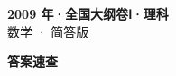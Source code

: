 \documentclass[zihao=-4, a4paper]{ctexart}
\begin{document}
\begin{center}
  {\Large\bfseries 2009 年·全国大纲卷Ⅰ·理科}\\[4pt]
  {\large 数学 · 简答版}
\end{center}
\medskip
{}

\clearpage
{}
\begin{center}{\Large\bfseries 答案速查}\end{center}
\medskip

\end{document}
